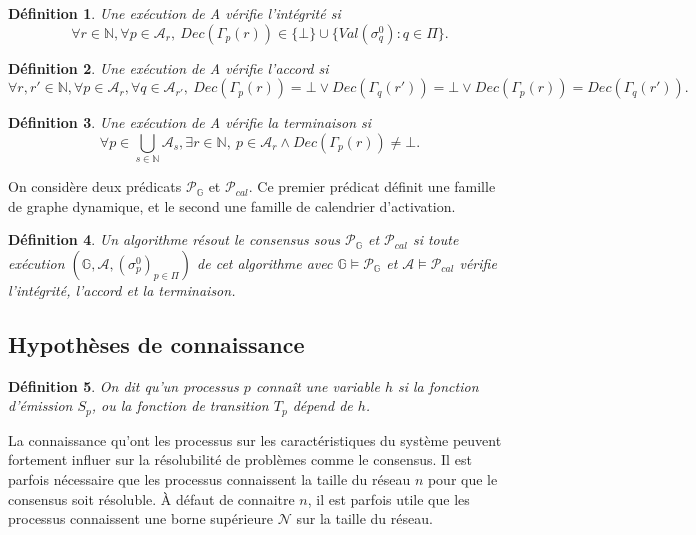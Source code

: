 \documentclass{article}
\newtheorem{definition}{Définition}
\begin{document}
\begin{definition}
	Une exécution de A \emph{vérifie  l'intégrité} si 
	$$ \forall r \in \mathds{N},\forall p \in \mathcal{A}_{r}, \ Dec(\Gamma_p(r)) \in \{ \bot \} \cup  \{ Val(\sigma^0_q) :  q \in \Pi \}  .$$
\end{definition}

\begin{definition}
	Une exécution de A  \emph{vérifie l'accord} si
	$$\forall r, r'  \in \mathds{N}, \forall p \in \mathcal{A}_{r}, \forall q \in \mathcal{A}_{r'}, 
		\ Dec(\Gamma_p(r)) = \bot \vee Dec(\Gamma_q(r')) = \bot \vee Dec(\Gamma_p(r)) = Dec(\Gamma_q(r')) .$$
\end{definition}

\begin{definition}
	Une exécution de A \emph{vérifie la terminaison} si
	$$ \forall p \in \bigcup\limits_{s \in \mathds{N}} \mathcal{A}_s, \exists r \in \mathds{N}, \ 
		p \in \mathcal{A}_r \wedge Dec(\Gamma_p(r)) \neq \bot .  $$
\end{definition}

On considère deux prédicats $\mathcal{P}_{\mathds{G}}$ et $\mathcal{P}_{cal}$.
Ce premier prédicat définit une famille de graphe dynamique, et le second une famille de calendrier d'activation.
	
\begin{definition}\label{def:resforte}
	Un algorithme \emph{résout le consensus sous $\mathcal{P}_{\mathds{G}}$ et $\mathcal{P}_{cal}$} si toute exécution 
	$( \mathds{G} ,  \mathcal{A} , (\sigma^0_p)_{p \in \Pi})$    de cet algorithme
	avec $ \mathds{G} \models \mathcal{P}_{\mathds{G}}$ et $\mathcal{A}	\models \mathcal{P}_{cal}$  vérifie l'intégrité, l'accord et la terminaison.
\end{definition}


\subsection{Hypothèses de connaissance}

\begin{definition}
	On dit qu'un processus $p$ \textit{connaît} une variable $h$ si la fonction d'émission $S_p$, ou la fonction de transition $T_p$ dépend de $h$. 
\end{definition}

La connaissance qu'ont les processus sur les caractéristiques du système peuvent fortement influer sur la résolubilité de problèmes comme le consensus.
Il est parfois nécessaire que les processus connaissent la taille du réseau $n$ pour que le consensus soit résoluble.
À défaut de connaitre $n$, il est parfois utile que les processus connaissent une borne supérieure $\mathcal{N}$ sur la taille du réseau.
\end{document}
